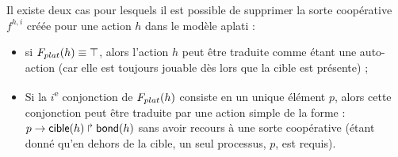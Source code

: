 Il existe deux cas pour lesquels il est possible de supprimer la sorte coopérative $f^{h,i}$
créée pour une action $h$ dans le modèle aplati :
\begin{itemize}
  \item si $F_{plat}(h) \equiv \top$, alors l'action $h$ peut être traduite comme étant
    une auto-action (car elle est toujours jouable dès lors que la cible est présente) ;
  \item Si la $i$\textsuperscript{e} conjonction de $F_{plat}(h)$ consiste
    en un unique élément $p$, alors cette conjonction peut être traduite par une action simple
    de la forme : $p\rightarrow\mathsf{cible}(h)\Rsh\mathsf{bond}(h)$ sans avoir recours à une sorte coopérative
    (étant donné qu'en dehors de la cible, un seul processus, $p$, est requis).
\end{itemize}

